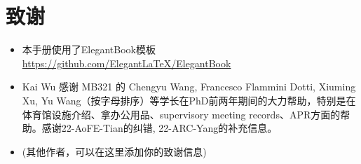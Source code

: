 \chapter{致谢}
\begin{itemize}
    \item 本手册使用了ElegantBook模板 \url{https://github.com/ElegantLaTeX/ElegantBook}
    \item Kai Wu 感谢 MB321 的 Chengyu Wang, Francesco Flammini Dotti, Xiuming Xu, Yu Wang（按字母排序）等学长在PhD前两年期间的大力帮助，特别是在体育馆设施介绍、拿办公用品、supervisory meeting records、APR方面的帮助。感谢22-AoFE-Tian的纠错, 22-ARC-Yang的补充信息。
    \item (其他作者，可以在这里添加你的致谢信息)
\end{itemize}


